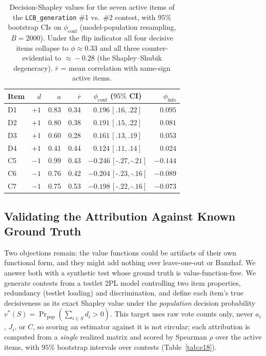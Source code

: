 \documentclass[conference]{IEEEtran}
\begin{document}
\begin{table}[t]
\centering
\caption{Decision-Shapley values for the seven active items of the \texttt{LCB\_generation} \#1 vs.\ \#2 contest, with $95\%$ bootstrap CIs on $\phi_{\text{conf}}$ (model-population resampling, $B\!=\!2000$). Under the flip indicator all four decisive items collapse to $\phi\!\approx\!0.33$ and all three counter-evidential to $\approx\!-0.28$ (the Shapley--Shubik degeneracy). $\bar r$ = mean correlation with same-sign active items.}
\label{tab:showcase}
\footnotesize
\setlength{\tabcolsep}{4pt}
\begin{tabular}{@{}lrrrcr@{}}
\toprule
\textbf{Item} & $d$ & $a$ & $\bar r$ & $\phi_{\text{conf}}$ ($95\%$ CI) & $\phi_{\text{info}}$ \\
\midrule
D1 & $+1$ & 0.83 & 0.34 & $0.196$\,$[.16,.22]$ & $0.095$ \\
D2 & $+1$ & 0.80 & 0.38 & $0.191$\,$[.15,.22]$ & $0.081$ \\
D3 & $+1$ & 0.60 & 0.28 & $0.161$\,$[.13,.19]$ & $0.053$ \\
D4 & $+1$ & 0.41 & 0.44 & $0.124$\,$[.11,.14]$ & $0.024$ \\
C5 & $-1$ & 0.99 & 0.43 & $-0.246$\,$[\text{-}.27,\text{-}.21]$ & $-0.144$ \\
C6 & $-1$ & 0.76 & 0.42 & $-0.204$\,$[\text{-}.23,\text{-}.16]$ & $-0.089$ \\
C7 & $-1$ & 0.75 & 0.53 & $-0.198$\,$[\text{-}.22,\text{-}.16]$ & $-0.073$ \\
\bottomrule
\end{tabular}
\end{table}

\subsection{Validating the Attribution Against Known Ground Truth}
\label{sec:e18val}

Two objections remain: the value functions could be artifacts of their own functional form, and they might add nothing over leave-one-out or Banzhaf.
We answer both with a synthetic test whose ground truth is value-function-free.
We generate contests from a testlet 2PL model controlling two item properties, redundancy (testlet loading) and discrimination, and define each item's true decisiveness as its exact Shapley value under the \emph{population} decision probability $v^{*}(S)=\Pr_{\text{pop}}(\sum_{i\in S} d_i>0)$.
This target uses raw vote counts only, never $a_i$, $J_i$, or $C$, so scoring an estimator against it is not circular; each attribution is computed from a \emph{single} realized matrix and scored by Spearman $\rho$ over the active items, with $95\%$ bootstrap intervals over contests (Table~\ref{tab:e18}).
\end{document}
